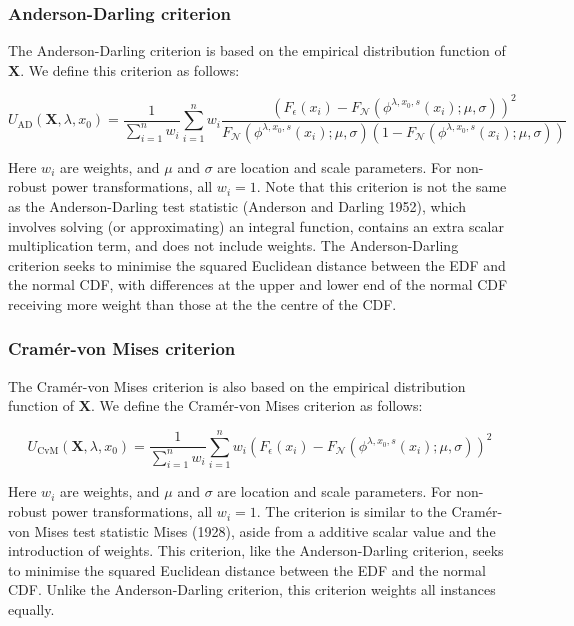 \documentclass[preprint,12pt,authoryear]{elsarticle}
\begin{document}
\subsubsection{Anderson-Darling
criterion}\label{anderson-darling-criterion}

The Anderson-Darling criterion is based on the empirical distribution
function of \(\mathbf{X}\). We define this criterion as follows:

\begin{equation}
U_{\text{AD}} \left(\mathbf{X}, \lambda, x_0 \right) = \frac{1}{\sum_{i=1}^n w_i} \sum_{i=1}^n w_i \frac{\left( F_{\epsilon}\left(x_i \right) - F_{\mathcal{N}} \left(\phi^{\lambda, x_0, s} \left(x_i \right); \mu, \sigma \right) \right)^2} {F_{\mathcal{N}} \left(\phi^{\lambda, x_0, s} \left(x_i \right); \mu, \sigma \right) \left(1 - F_{\mathcal{N}} \left(\phi^{\lambda, x_0, s} \left(x_i \right); \mu, \sigma \right) \right) }
\end{equation}

Here \(w_i\) are weights, and \(\mu\) and \(\sigma\) are location and
scale parameters. For non-robust power transformations, all \(w_i = 1\).
Note that this criterion is not the same as the Anderson-Darling test
statistic (Anderson and Darling 1952), which involves solving (or
approximating) an integral function, contains an extra scalar
multiplication term, and does not include weights. The Anderson-Darling
criterion seeks to minimise the squared Euclidean distance between the
EDF and the normal CDF, with differences at the upper and lower end of
the normal CDF receiving more weight than those at the the centre of the
CDF.

\subsubsection{Cramér-von Mises
criterion}\label{cramuxe9r-von-mises-criterion}

The Cramér-von Mises criterion is also based on the empirical
distribution function of \(\mathbf{X}\). We define the Cramér-von Mises
criterion as follows:

\begin{equation}
U_{\text{CvM}} \left(\mathbf{X}, \lambda, x_0 \right) = \frac{1}{\sum_{i=1}^n w_i} \sum_{i=1}^n w_i \left( F_{\epsilon}\left(x_i \right) - F_{\mathcal{N}} \left(\phi^{\lambda, x_0, s} \left(x_i \right); \mu, \sigma \right) \right)^2
\end{equation}

Here \(w_i\) are weights, and \(\mu\) and \(\sigma\) are location and
scale parameters. For non-robust power transformations, all \(w_i = 1\).
The criterion is similar to the Cramér-von Mises test statistic Mises
(1928), aside from a additive scalar value and the introduction of
weights. This criterion, like the Anderson-Darling criterion, seeks to
minimise the squared Euclidean distance between the EDF and the normal
CDF. Unlike the Anderson-Darling criterion, this criterion weights all
instances equally.
\end{document}
